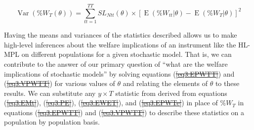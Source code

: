\documentclass[11pt,a4paper]{article} %
\newcommand{\E}{\operatorname{E}}			%
\newcommand{\Var}{\operatorname{Var}}		%
\providecommand{\DIFaddtex}[1]{{\protect\color{blue}\uwave{#1}}} %
\providecommand{\DIFdeltex}[1]{{\protect\color{red}\sout{#1}}}                      %
\providecommand{\DIFaddbegin}{} %
\providecommand{\DIFaddend}{} %
\providecommand{\DIFdelbegin}{} %
\providecommand{\DIFdelend}{} %
\providecommand{\DIFadd}[1]{\texorpdfstring{\DIFaddtex{#1}}{#1}} %
\providecommand{\DIFdel}[1]{\texorpdfstring{\DIFdeltex{#1}}{}} %
\newcommand{\DIFscaledelfig}{0.5}
\newlength{\DIFdelgraphicswidth} %
\newlength{\DIFdelgraphicsheight} %
\newcommand{\DIFaddincludegraphics}[2][]{{\color{blue}\fbox{\DIFOincludegraphics[#1]{#2}}}} %
\newcommand{\DIFdelincludegraphics}[2][]{%
\sbox{\DIFdelgraphicsbox}{\DIFOincludegraphics[#1]{#2}}%
\settoboxwidth{\DIFdelgraphicswidth}{\DIFdelgraphicsbox} %
\settoboxtotalheight{\DIFdelgraphicsheight}{\DIFdelgraphicsbox} %
\scalebox{\DIFscaledelfig}{%
\parbox[b]{\DIFdelgraphicswidth}{\usebox{\DIFdelgraphicsbox}\\[-\baselineskip] \rule{\DIFdelgraphicswidth}{0em}}\llap{\resizebox{\DIFdelgraphicswidth}{\DIFdelgraphicsheight}{%
\setlength{\unitlength}{\DIFdelgraphicswidth}%
\begin{picture}(1,1)%
\thicklines\linethickness{2pt} %
{\color[rgb]{1,0,0}\put(0,0){\framebox(1,1){}}}%
{\color[rgb]{1,0,0}\put(0,0){\line( 1,1){1}}}%
{\color[rgb]{1,0,0}\put(0,1){\line(1,-1){1}}}%
\end{picture}%
}\hspace*{3pt}}} %
} %
\DeclareRobustCommand{\DIFaddbegin}{\DIFOaddbegin \let\includegraphics\DIFaddincludegraphics} %
\DeclareRobustCommand{\DIFaddend}{\DIFOaddend \let\includegraphics\DIFOincludegraphics} %
\DeclareRobustCommand{\DIFdelbegin}{\DIFOdelbegin \let\includegraphics\DIFdelincludegraphics} %
\DeclareRobustCommand{\DIFdelend}{\DIFOaddend \let\includegraphics\DIFOincludegraphics} %
\begin{document}
\begin{equation}
	\DIFdelbegin %
\DIFdelend \DIFaddbegin \label{eq:VPWTT}
	\DIFaddend \Var(\%W_T(\theta)) = \sum_{tt=1}^{TT} \mathit{SL}_{Ntt}(\theta) \times \left[ \E(\%W_{tt} | \theta) - \E(\%W_T | \theta) \right]^2
\end{equation}

Having the means and variances of the statistics described allows us to make high-level inferences about the welfare implications of an instrument like the HL-MPL on different populations for a given stochastic model.
That is, we can contribute to the answer of our primary question of \enquote{what are the welfare implications of stochastic models} by solving equations (\DIFdelbegin \DIFdel{\ref{eq3:EPWTT}}\DIFdelend \DIFaddbegin \DIFadd{\ref{eq:EPWTT}}\DIFaddend ) and (\DIFdelbegin \DIFdel{\ref{eq3:VPWTT}}\DIFdelend \DIFaddbegin \DIFadd{\ref{eq:VPWTT}}\DIFaddend ) for various values of $\theta$ and relating the elements of $\theta$ to these results.
We can substitute any  $y \times T$ statistic from derived from equations (\DIFdelbegin \DIFdel{\ref{eq3:EMt}}\DIFdelend \DIFaddbegin \DIFadd{\ref{eq:EMt}}\DIFaddend ), (\DIFdelbegin \DIFdel{\ref{eq3:PE}}\DIFdelend \DIFaddbegin \DIFadd{\ref{eq:PE}}\DIFaddend ), (\DIFdelbegin \DIFdel{\ref{eq3:EWET}}\DIFdelend \DIFaddbegin \DIFadd{\ref{eq:EPWT}}\DIFaddend ), and (\DIFdelbegin \DIFdel{\ref{eq3:EPWTe}}\DIFdelend \DIFaddbegin \DIFadd{\ref{eq:EPWTe}}\DIFaddend ) in place of $\%W_T$ in equations (\DIFdelbegin \DIFdel{\ref{eq3:EPWTT}}\DIFdelend \DIFaddbegin \DIFadd{\ref{eq:EPWTT}}\DIFaddend ) and (\DIFdelbegin \DIFdel{\ref{eq3:VPWTT}}\DIFdelend \DIFaddbegin \DIFadd{\ref{eq:VPWTT}}\DIFaddend ) to describe these statistics on a population by population basis.
\end{document}
